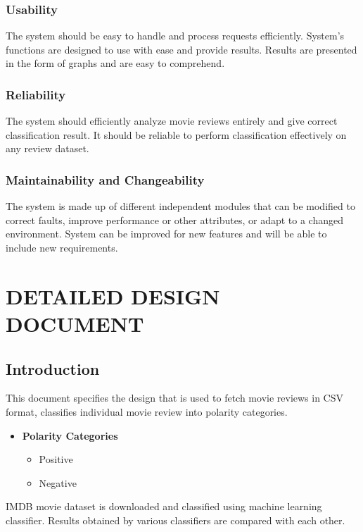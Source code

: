 \documentclass[oneside,a4paper,12pt]{pictreport}
\begin{document}
\subsection{Usability}
The system should be easy to handle and process requests efficiently. System's functions are designed to use with ease and provide results. Results are presented in the form of graphs and are easy to comprehend.

\subsection{Reliability}
The system should efficiently analyze movie reviews entirely and give correct classification result. It should be reliable to perform 
classification effectively on any review dataset.
\subsection{Maintainability and Changeability}
The system is made up of different independent modules that can be modified to correct faults, improve performance or other attributes, or adapt to a changed environment. System can be improved for new features and will be able to include new requirements.

\chapter{DETAILED DESIGN DOCUMENT}

\section{Introduction}
This document specifies the design that is used to fetch movie reviews in CSV format, classifies individual movie review into polarity categories.
\begin{itemize}
 


    \item \textbf{Polarity Categories}
    \begin{itemize}
    \item Positive
    \item Negative
   
    \end{itemize}
\end{itemize}
IMDB movie dataset is downloaded and classified using machine learning classifier.
Results obtained by various classifiers are compared with each other.
\newpage
\end{document}
